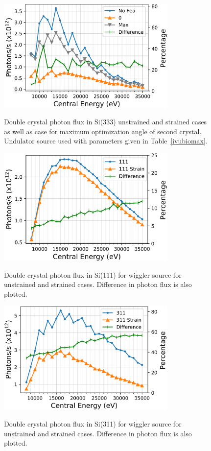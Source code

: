 \documentclass{iucr}
\begin{document}
\begin{figure}
\caption{Double crystal photon flux in Si(333) unstrained and strained cases as well as case for maximum optimization angle of second crystal. Undulator source used with parameters given in Table~\ref{ivubiomax}.}
\includegraphics[width = 8.85cm]{images/maxangleflux.png}
\label{fig:maxangleflux}
\end{figure}

\begin{figure}
\caption{Double crystal photon flux in Si(111) for wiggler source for unstrained and strained cases. Difference in photon flux is also plotted.}
\includegraphics[width = 8.85cm]{images/ivw111flux.png}
\label{fig:ivw111flux}
\end{figure}

\begin{figure}
\caption{Double crystal photon flux in Si(311) for wiggler source for unstrained and strained cases. Difference in photon flux is also plotted.}
\includegraphics[width = 8.85cm]{images/ivw311flux.png}
\label{fig:ivw311flux}
\end{figure}
\end{document}
